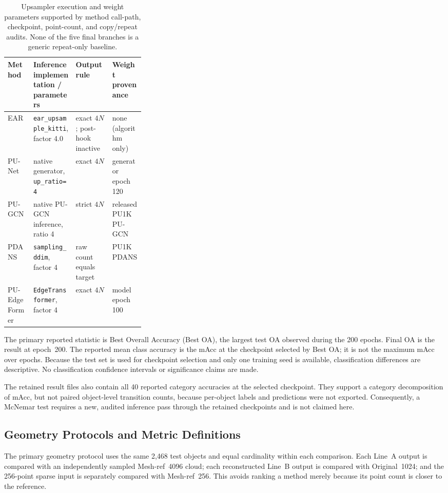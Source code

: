 \begin{table}[htbp]
\centering
\small
\begin{tabularx}{\linewidth}{l>{\raggedright\arraybackslash}p{0.31\linewidth}lX}
\toprule
Method & Inference implementation / parameters & Output rule & Weight provenance \\
\midrule
EAR & \texttt{ear\_upsample\_kitti}, factor 4.0 & exact $4N$; post-hook inactive & none (algorithm only) \\
PU-Net & native generator, \texttt{up\_ratio=4} & exact $4N$ & generator epoch 120 \\
PU-GCN & native PU-GCN inference, ratio 4 & strict $4N$ & released PU1K PU-GCN \\
PDANS & \texttt{sampling\_ddim}, factor 4 & raw count equals target & PU1K PDANS \\
PU-EdgeFormer & \texttt{EdgeTransformer}, factor 4 & exact $4N$ & model epoch 100 \\
\bottomrule
\end{tabularx}
\caption{Upsampler execution and weight parameters supported by method call-path, checkpoint, point-count, and copy/repeat audits. None of the five final branches is a generic repeat-only baseline.}
\label{tab:upsampler-parameters}
\end{table}

The primary reported statistic is Best Overall Accuracy (Best OA), the largest test OA observed during the 200 epochs. Final OA is the result at epoch~200. The reported mean class accuracy is the mAcc at the checkpoint selected by Best OA; it is not the maximum mAcc over epochs. Because the test set is used for checkpoint selection and only one training seed is available, classification differences are descriptive. No classification confidence intervals or significance claims are made.

The retained result files also contain all 40 reported category accuracies at the selected checkpoint. They support a category decomposition of mAcc, but not paired object-level transition counts, because per-object labels and predictions were not exported. Consequently, a McNemar test requires a new, audited inference pass through the retained checkpoints and is not claimed here.

\subsection{Geometry Protocols and Metric Definitions}

The primary geometry protocol uses the same 2,468 test objects and equal cardinality within each comparison. Each Line~A output is compared with an independently sampled Mesh-ref~4096 cloud; each reconstructed Line~B output is compared with Original~1024; and the 256-point sparse input is separately compared with Mesh-ref~256. This avoids ranking a method merely because its point count is closer to the reference.

